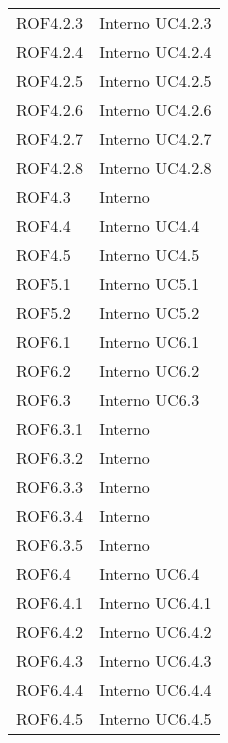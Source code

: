 \begin{longtable}{p{2.5cm}!{\VRule[1pt]}p{2.5cm}}
ROF4.2.3 & Interno \newline UC4.2.3
 \\
ROF4.2.4 & Interno \newline UC4.2.4
 \\
ROF4.2.5 & Interno \newline UC4.2.5
 \\
ROF4.2.6 & Interno \newline UC4.2.6
 \\
ROF4.2.7 & Interno \newline UC4.2.7
 \\
ROF4.2.8 & Interno \newline UC4.2.8
 \\
ROF4.3 & Interno \\
ROF4.4 & Interno \newline UC4.4
 \\
ROF4.5 & Interno \newline UC4.5
 \\
ROF5.1 & Interno \newline UC5.1
 \\
ROF5.2 & Interno \newline UC5.2
 \\
ROF6.1 & Interno \newline UC6.1
 \\
ROF6.2 & Interno \newline UC6.2
 \\
ROF6.3 & Interno \newline UC6.3
 \\
ROF6.3.1 & Interno \\
ROF6.3.2 & Interno \\
ROF6.3.3 & Interno \\
ROF6.3.4 & Interno \\
ROF6.3.5 & Interno \\
ROF6.4 & Interno \newline UC6.4
 \\
ROF6.4.1 & Interno \newline UC6.4.1
 \\
ROF6.4.2 & Interno \newline UC6.4.2
 \\
ROF6.4.3 & Interno \newline UC6.4.3
 \\
ROF6.4.4 & Interno \newline UC6.4.4
 \\
ROF6.4.5 & Interno \newline UC6.4.5
 \\

\end{longtable}
